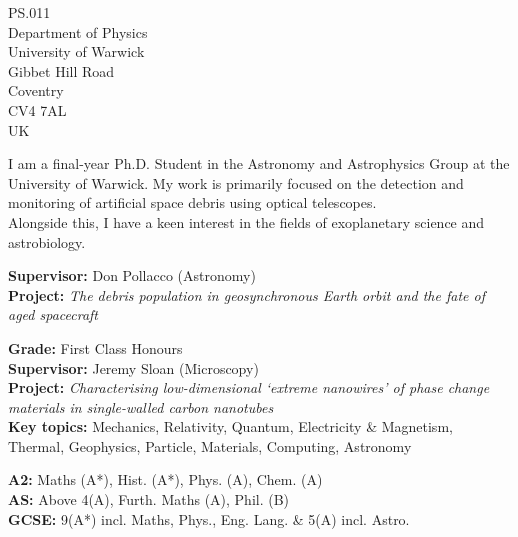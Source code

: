 
\begin{flushright}
\vspace{-1em}
\small PS.011 \\
Department of Physics \\
University of Warwick \\
Gibbet Hill Road \\
Coventry \\
CV4 7AL \\
UK
\end{flushright}

\medskip


\small I am a final-year Ph.D. Student in the Astronomy and Astrophysics Group at the University of Warwick.
My work is primarily focused on the detection and monitoring of artificial space debris using optical telescopes. \\
Alongside this, I have a keen interest in the fields of exoplanetary science and astrobiology.

\medskip


\vspace{-1em}
\small \justify \textbf{Supervisor:} Don Pollacco (Astronomy) \\
\textbf{Project:} \textit{The debris population in geosynchronous Earth orbit and the fate of aged spacecraft}

\divider

\small \textbf{Grade:} First Class Honours \\
\textbf{Supervisor:} Jeremy Sloan (Microscopy) \\
\textbf{Project:} \textit{Characterising low-dimensional `extreme nanowires' of phase change materials in single-walled carbon nanotubes} \\
\textbf{Key topics:} Mechanics, Relativity, Quantum, Electricity \& Magnetism, Thermal, Geophysics, Particle, Materials, Computing, Astronomy 

\divider

\small \textbf{A2:} Maths (A*), Hist. (A*), Phys. (A), Chem. (A) \\
\textbf{AS:} Above 4(A), Furth. Maths (A), Phil. (B) \\
\textbf{GCSE:} 9(A*) incl. Maths, Phys., Eng. Lang. \& 5(A) incl. Astro.

